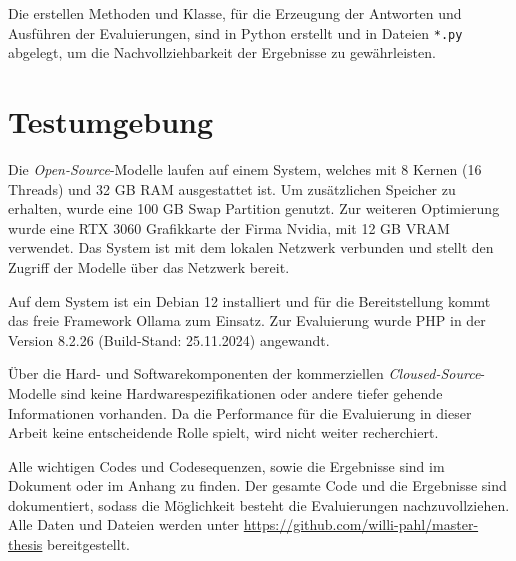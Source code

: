 Die erstellen Methoden und Klasse, für die Erzeugung der Antworten und Ausführen der Evaluierungen, sind in Python erstellt und in Dateien \texttt{*.py} abgelegt, um die Nachvollziehbarkeit der Ergebnisse zu gewährleisten.



\section{Testumgebung}
Die \textit{Open-Source}-Modelle laufen auf einem System, welches mit 8 Kernen (16 Threads) und 32 GB RAM ausgestattet ist. Um zusätzlichen Speicher zu erhalten, wurde eine 100 GB Swap Partition genutzt. Zur weiteren Optimierung wurde eine RTX 3060 Grafikkarte der Firma Nvidia, mit 12 GB VRAM verwendet. Das System ist mit dem lokalen Netzwerk verbunden und stellt den Zugriff der Modelle über das Netzwerk bereit.\vspace{0.2cm}

Auf dem System ist ein Debian 12 installiert und für die Bereitstellung kommt das freie Framework Ollama zum Einsatz. Zur Evaluierung wurde PHP in der Version 8.2.26 (Build-Stand: 25.11.2024) angewandt.\vspace{0.2cm}

Über die Hard- und Softwarekomponenten der kommerziellen \textit{Cloused-Source}-Modelle sind keine Hardwarespezifikationen oder andere tiefer gehende Informationen vorhanden. Da die Performance für die Evaluierung in dieser Arbeit keine entscheidende Rolle spielt, wird nicht weiter recherchiert.\vspace{0.2cm}

Alle wichtigen Codes und Codesequenzen, sowie die Ergebnisse sind im Dokument oder im Anhang zu finden. Der gesamte Code und die Ergebnisse sind dokumentiert, sodass die Möglichkeit besteht die Evaluierungen nachzuvollziehen. Alle Daten und Dateien werden unter \href{https://github.com/willi-pahl/master-thesis}{https://github.com/willi-pahl/master-thesis} bereitgestellt.\vspace{0.2cm}
